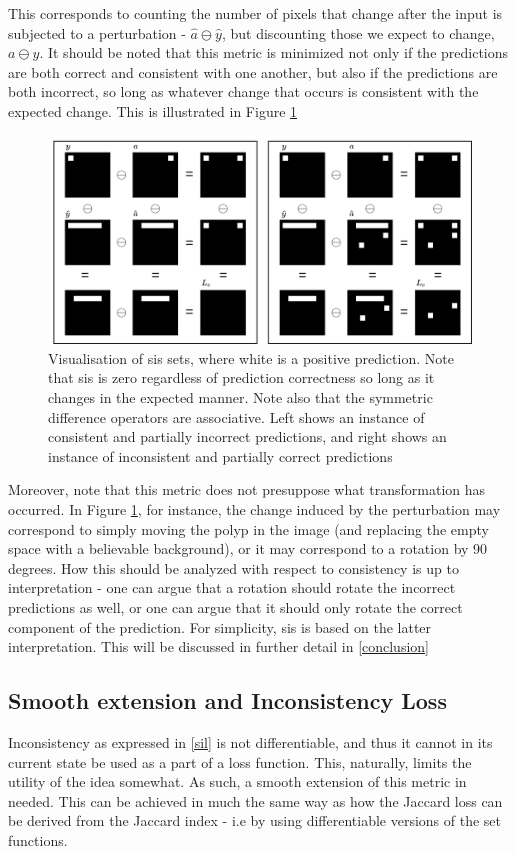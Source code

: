 This corresponds to counting the number of pixels that change after the input is subjected to a perturbation - \(\hat{a}\ominus \hat{y}\), but discounting those we expect to change, \(a\ominus y\). 
It should be noted that this metric is minimized not only if the predictions are both correct and consistent with one another, but also if the predictions are both incorrect, so long as whatever change that occurs is consistent with the expected change. This is illustrated in Figure \ref{loss_fn}
\begin{figure}[ht]
    \includegraphics[width=\linewidth]{illustrations/loss_visualisation.drawio.png}
    \caption{Visualisation of \gls{sis} sets, where white is a positive prediction. Note that \gls{sis} is zero regardless of prediction correctness so long as it changes in the expected manner. Note also that the symmetric difference operators are associative. Left shows an instance of consistent and partially incorrect predictions, and right shows an instance of inconsistent and partially correct predictions}
    \label{loss_fn}
\end{figure}  
    
Moreover, note that this metric does not presuppose what transformation has occurred. In Figure \ref{loss_fn}, for instance, the change induced by the perturbation may correspond to simply moving the polyp in the image (and replacing the empty space with a believable background), or it may correspond to a rotation by 90 degrees. How this should be analyzed with respect to consistency is up to interpretation - one can argue that a rotation should rotate the incorrect predictions as well, or one can argue that it should only rotate the correct component of the prediction. For simplicity, \gls{sis} is based on the latter interpretation. This will be discussed in further detail in \autoref{conclusion}

\subsection{Smooth extension and Inconsistency Loss}
Inconsistency as expressed in \autoref{sil} is not differentiable, and thus it cannot in its current state be used as a part of a loss function. This, naturally, limits the utility of the idea somewhat. As such, a smooth extension of this metric in needed. This can be achieved in much the same way as how the Jaccard loss can be derived from the Jaccard index - i.e by using differentiable versions of the set functions. 

